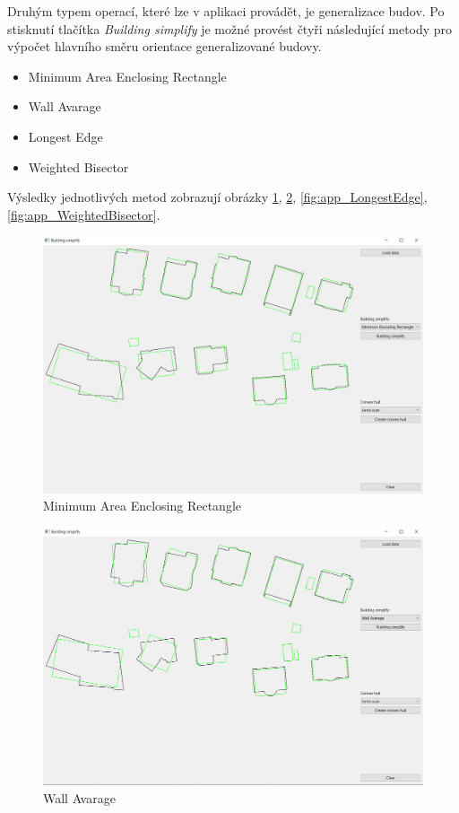 \documentclass[11pt]{article}
\begin{document}
		Druhým typem operací, které lze v aplikaci provádět, je generalizace budov. Po stisknutí tlačítka \textit{Building simplify} je možné provést čtyři následující metody pro výpočet hlavního směru orientace generalizované budovy.
		
		\begin{itemize}
			\item Minimum Area Enclosing Rectangle 
			\item Wall Avarage 
			\item Longest Edge
			\item Weighted Bisector 
		\end{itemize}
		
		Výsledky jednotlivých metod zobrazují obrázky \ref{fig:app_MAER}, \ref{fig:app_WallAvarage}, \ref{fig:app_LongestEdge}, \ref{fig:app_WeightedBisector}.
		\begin{figure}[htbh]
			\centering
			\includegraphics[scale=0.4]{images/U2_aplikace_MAER.png} 
			\caption{Minimum Area Enclosing Rectangle}
			\label{fig:app_MAER}
		\end{figure} 
		\begin{figure}[htbh]
			\centering
			\includegraphics[scale=0.4]{images/U2_aplikace_WallAvarage.png} 
			\caption{Wall Avarage}
			\label{fig:app_WallAvarage}
		\end{figure} 
\end{document}
